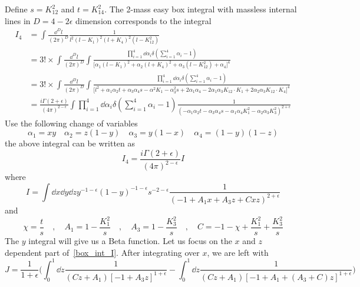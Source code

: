 Define $s=K_{12}^2$ and $t=K_{14}^2$.
The 2-mass easy box integral with massless internal lines in $D=4-2\epsilon$ dimension corresponds to the integral
\begin{equation*}
\begin{split}
I_4 & = \int\frac{\dd^D l }{(2\pi)^D}\frac{1}{ l^2(l-K_1)^2(l+K_4)^2 (l-K_{12}^2)}
\\
&=
3!\times\int\frac{\dd^D l }{(2\pi)^D}
\int
\frac{\prod_{i=1}^4\dd\alpha_i \delta(\sum_{i=1}^4\alpha_i -1)}{\big[\alpha_1(l-K_1)^2 + \alpha_2(l+K_4)^2 + \alpha_3 (l-K_{12}^2) + \alpha_4\big]^4}
\\
&=
3!\times\int\frac{\dd^D l }{(2\pi)^D}
\int
\frac{\prod_{i=1}^4\dd\alpha_i \delta(\sum_{i=1}^4\alpha_i -1)}{\big[l^2 + \alpha_1\alpha_2 t + \alpha_3\alpha_4 s
-\alpha^2 K_1 - \alpha_3^2s + 2\alpha_1\alpha_4 - 2\alpha_1\alpha_3K_{12}\cdot K_1 + 2\alpha_2\alpha_3 K_{12}\cdot K_4
\big]^4}
\\
&= \frac{i\Gamma(2+\epsilon)}{(4\pi)^{2-\epsilon}}\int\prod_{i=1}^4\dd\alpha_i \delta(\sum_{i=1}^4\alpha_i -1)\frac{1}{(-\alpha_1\alpha_2 t - \alpha_3\alpha_4 s 
-\alpha_1\alpha_4 K_1^2 - \alpha_2\alpha_3 K_{3}^2)^{2+\epsilon}}
\end{split}
\end{equation*}
%
Use the following change of variables
\begin{equation*}
\alpha_1 = xy \quad
\alpha_2 = z(1-y)\quad
\alpha_3 = y(1-x)\quad
\alpha_4 = (1-y)(1-z)
\end{equation*}
the above integral can be written as
\begin{equation*}
I_4 = \frac{i\Gamma(2+\epsilon)}{(4\pi)^{2-\epsilon}} I
\end{equation*}
where
\begin{equation}\label{box_int_I}
I = \int\dd x\dd y \dd z y^{-1-\epsilon}(1-y)^{-1-\epsilon}s^{-2-\epsilon}
\frac{1}{(-1 + A_1 x + A_3 z + C xz)^{2+\epsilon}}
\end{equation}
and
\begin{equation*}
\chi = \frac{t}{s}\quad, \quad
A_1 = 1 - \frac{K_1^2}{s}\quad, \quad
A_3 = 1 - \frac{K_3^2}{s} \quad,\quad
C = -1 - \chi  + \frac{K_1^2}{s} + \frac{K_3^2}{s}
\end{equation*}
The $y$ integral will give us a Beta function.
Let us focus on the $x$ and $z$ dependent part of~\cref{box_int_I}.
After integrating over $x$, we are left with 
\begin{equation*}
J = \frac{1}{1+\epsilon}\Big(\int^1_0\dd z\frac{1}{(Cz + A_1)[-1 + A_3z]^{1+\epsilon}} - 
\int^1_0\dd z\frac{1}{(Cz + A_1)[-1 + A_1  + (A_3 + C)z]^{1+\epsilon} }\Big)
\end{equation*}
